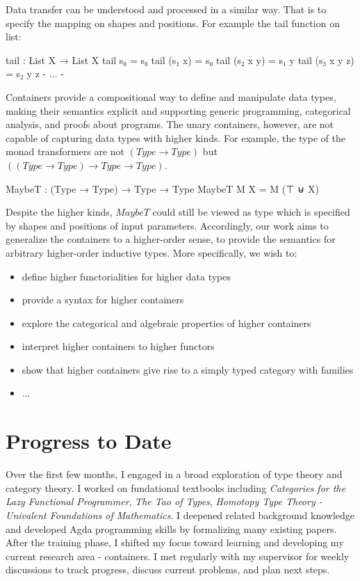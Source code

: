 Data transfer can be understood and processed in a similar way. That is to specify the mapping on shapes and positions. For example the tail function on list:

\begin{code}
tail : List X → List X
tail s₀ = s₀
tail (s₁ x) = s₀
tail (s₂ x y) = s₁ y
tail (s₃ x y z) = s₂ y z
{- ... -}
\end{code}

Containers provide a compositional way to define and manipulate data types, making their semantics explicit and supporting generic programming, categorical analysis, and proofs about programs. The unary containers, however, are not capable of capturing data types with higher kinds. For example, the type of the monad transformers\cite{liang1995monad} are not $(Type \to Type)$ but $((Type \to Type) \to Type \to Type)$.

\begin{code}
MaybeT : (Type → Type) → Type → Type
MaybeT M X = M (⊤ ⊎ X)
\end{code}

Despite the higher kinds, $MaybeT$ could still be viewed as type which is specified by shapes and positions of input parameters. Accordingly, our work aims to generalize the containers to a higher-order sense, to provide the semantics for arbitrary higher-order inductive types. More specifically, we wish to:

\begin{itemize}
  \item{define higher functorialities for higher data types}
  \item{provide a syntax for higher containers}
  \item{explore the categorical and algebraic properties of higher containers}
  \item{interpret higher containers to higher functors}
  \item{show that higher containers give rise to a simply typed category with families}
  \item{...}
\end{itemize}

\section{Progress to Date}

Over the first few months, I engaged in a broad exploration of type theory and category theory. I worked on fundational textbooks including \textit{Categories for the Lazy Functional Programmer}\cite{altenkirch2024categories}, \textit{The Tao of Types}\cite{altenkirch2021types}, \textit{Homotopy Type Theory - Univalent Foundations of Mathematics}\cite{program2013homotopy}. I deepened related background knowledge and developed Agda programming skills by formalizing many existing papers. After the training phase, I shifted my focus toward learning and developing my current research area - containers. I met regularly with my supervisor for weekly discussions to track progress, discuss current problems, and plan next steps.

